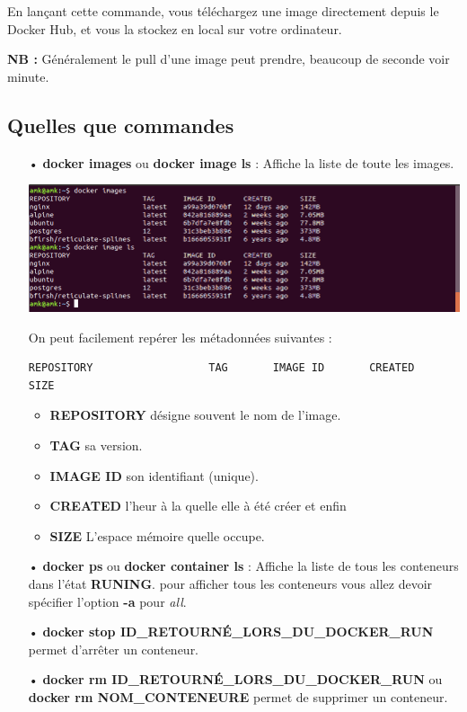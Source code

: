 \documentclass[12pt,a4paper]{article}
\begin{document}
En lançant cette commande, vous téléchargez une image directement depuis le Docker Hub, et vous la stockez en local sur votre ordinateur.

\textbf{NB : } Généralement le pull d'une image peut prendre, beaucoup de seconde voir minute.

\subsection{Quelles que commandes}
\begin{itemize}
\item[•] \textbf{docker images} ou \textbf{docker image ls} : Affiche la liste de toute les
images.
\begin{center}
\includegraphics[scale=0.5]{img/docker_images.png}
\end{center}
On peut facilement repérer les métadonnées suivantes :
\begin{verbatim}
REPOSITORY                  TAG       IMAGE ID       CREATED       SIZE
\end{verbatim}
\begin{itemize}
\item \textbf{REPOSITORY} désigne souvent le nom de l'image.
\item \textbf{TAG} sa version.
\item \textbf{IMAGE ID} son identifiant (unique).
\item \textbf{CREATED} l'heur à la quelle elle à été créer et enfin
\item \textbf{SIZE} L'espace mémoire quelle occupe.
\end{itemize}
\item[•] \textbf{docker ps} ou \textbf{docker container ls} : Affiche la liste de tous les
conteneurs dans l'état \textbf{RUNING}. pour afficher tous les conteneurs vous allez 
devoir spécifier l'option \textbf{-a} pour \textit{all}.
\item[•] \textbf{docker stop ID\_RETOURNÉ\_LORS\_DU\_DOCKER\_RUN} permet d'arrêter un conteneur.
\item[•] \textbf{docker rm ID\_RETOURNÉ\_LORS\_DU\_DOCKER\_RUN} ou \textbf{docker rm NOM\_CONTENEURE} permet de supprimer un conteneur.\\

\end{itemize}
\end{document}

